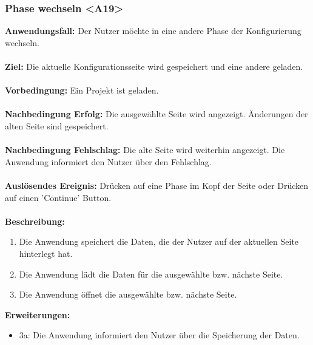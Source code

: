 \documentclass[parskip=full]{scrartcl} %
\begin{document}
\subsubsection*{Phase wechseln <A19>}
\textbf{Anwendungsfall:} Der Nutzer möchte in eine andere Phase der Konfigurierung wechseln.\\\\
\textbf{Ziel:} Die aktuelle Konfigurationsseite wird gespeichert und eine andere geladen. \\\\
\textbf{Vorbedingung:} Ein Projekt ist geladen. \\\\
\textbf{Nachbedingung Erfolg:} Die ausgewählte Seite wird angezeigt. Änderungen der alten Seite sind gespeichert.\\\\
\textbf{Nachbedingung Fehlschlag:} Die alte Seite wird weiterhin angezeigt. Die Anwendung informiert den Nutzer über den Fehlschlag. \\\\
\textbf{Auslösendes Ereignis:} Drücken auf eine Phase im Kopf der Seite oder Drücken auf einen 'Continue' Button. \\\\
\textbf{Beschreibung:}
\begin{enumerate}
    \item Die Anwendung speichert die Daten, die der Nutzer auf der aktuellen Seite hinterlegt hat.
    \item Die Anwendung lädt die Daten für die ausgewählte bzw. nächste Seite.
    \item Die Anwendung öffnet die ausgewählte bzw. nächste Seite.
\end{enumerate}
\textbf{Erweiterungen:} 
\begin{itemize}
    \item 3a: Die Anwendung informiert den Nutzer über die Speicherung der Daten.
\end{itemize}
\newpage
\end{document}
